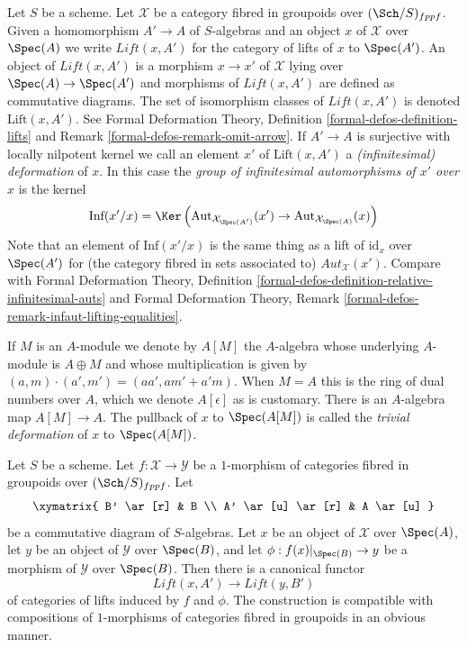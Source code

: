 \medskip\noindent
Let $S$ be a scheme. Let $\mathcal{X}$ be a category fibred in groupoids
over $(\Sch/S)_{fppf}$. Given a homomorphism $A' \to A$ of $S$-algebras
and an object $x$ of $\mathcal{X}$ over $\Spec(A)$ we write
$\textit{Lift}(x, A')$ for the category of lifts of $x$ to $\Spec(A')$.
An object of $\textit{Lift}(x, A')$ is a morphism $x \to x'$ of $\mathcal{X}$
lying over $\Spec(A) \to \Spec(A')$ and morphisms of $\textit{Lift}(x, A')$
are defined as commutative diagrams. The set of isomorphism classes of
$\textit{Lift}(x, A')$ is denoted $\text{Lift}(x, A')$. See
Formal Deformation Theory, Definition \ref{formal-defos-definition-lifts} and
Remark \ref{formal-defos-remark-omit-arrow}.
If $A' \to A$ is surjective with locally nilpotent kernel we call an element
$x'$ of $\text{Lift}(x, A')$ a {\it (infinitesimal) deformation} of $x$.
In this case the {\it group of infinitesimal automorphisms of $x'$ over $x$}
is the kernel
$$
\text{Inf}(x'/x) =
\Ker\left(
\text{Aut}_{\mathcal{X}_{\Spec(A')}}(x') \to
\text{Aut}_{\mathcal{X}_{\Spec(A)}}(x)\right)
$$
Note that an element of $\text{Inf}(x'/x)$ is the same thing as a lift
of $\text{id}_x$ over $\Spec(A')$ for (the category fibred in sets associated
to) $\mathit{Aut}_\mathcal{X}(x')$. Compare with
Formal Deformation Theory, Definition
\ref{formal-defos-definition-relative-infinitesimal-auts} and
Formal Deformation Theory, Remark
\ref{formal-defos-remark-infaut-lifting-equalities}.

\medskip\noindent
If $M$ is an $A$-module we denote by $A[M]$ the $A$-algebra whose underlying
$A$-module is $A \oplus M$ and whose multiplication is given by
$(a, m) \cdot (a', m') = (aa', am' + a'm)$. When $M = A$ this is the ring
of dual numbers over $A$, which we denote $A[\epsilon]$ as is customary.
There is an $A$-algebra map $A[M] \to A$. The pullback of $x$ to $\Spec(A[M])$
is called the {\it trivial deformation} of $x$ to $\Spec(A[M])$.

\begin{lemma}
\label{lemma-functoriality}
Let $S$ be a scheme. Let $f : \mathcal{X} \to \mathcal{Y}$ be a $1$-morphism
of categories fibred in groupoids over $(\Sch/S)_{fppf}$. Let
$$
\xymatrix{
B' \ar[r] & B \\
A' \ar[u] \ar[r] & A \ar[u]
}
$$
be a commutative diagram of $S$-algebras. Let $x$ be an object of $\mathcal{X}$
over $\Spec(A)$, let $y$ be an object of $\mathcal{Y}$ over $\Spec(B)$,
and let $\phi : f(x)|_{\Spec(B)} \to y$ be a morphism of $\mathcal{Y}$
over $\Spec(B)$. Then there is a canonical functor
$$
\textit{Lift}(x, A') \longrightarrow \textit{Lift}(y, B')
$$
of categories of lifts induced by $f$ and $\phi$. The construction is
compatible with compositions of $1$-morphisms of categories fibred in
groupoids in an obvious manner.
\end{lemma}

